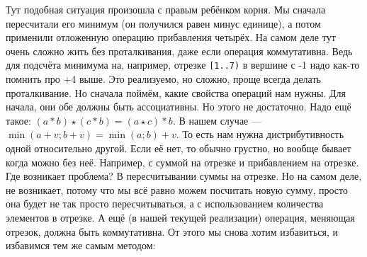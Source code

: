 \documentclass{article}
\newcommand{\pseudo}{PseudoLexer.py:PseudoLexer -x}
\newcommand{\pseudocode}[1]{\texttt{#1}}
\begin{document}
    \begin{center}
    \end{center}
    Тут подобная ситуация произошла с правым ребёнком корня. Мы сначала пересчитали его минимум (он получился равен минус единице), а потом применили отложенную операцию прибавления четырёх. На самом деле тут очень сложно жить без проталкивания, даже если операция коммутативна. Ведь для подсчёта минимума на, например, отрезке \pseudocode{[1..7)} в вершине с -1 надо как-то помнить про +4 выше. Это реализуемо, но сложно, проще всегда делать проталкивание. Но сначала поймём, какие свойства операций нам нужны. Для начала, они обе должны быть ассоциативны. Но этого не достаточно. Надо ещё такое: $(a*b)\star(c*b)=(a\star c)*b$. В нашем случае --- $\min(a+v;b+v)=\min(a;b)+v$. То есть нам нужна дистрибутивность одной относительно другой. Если её нет, то обычно грустно, но вообще бывает когда можно без неё. Например, с суммой на отрезке и прибавлением на отрезке. Где возникает проблема? В пересчитывании суммы на отрезке. Но на самом деле, не возникает, потому что мы всё равно можем посчитать новую сумму, просто она будет не так просто пересчитываться, а с использованием количества элементов в отрезке. А ещё (в нашей текущей реализации) операция, меняющая отрезок, должна быть коммутативна. От этого мы снова хотим избавиться, и избавимся тем же самым методом:
\end{document}
